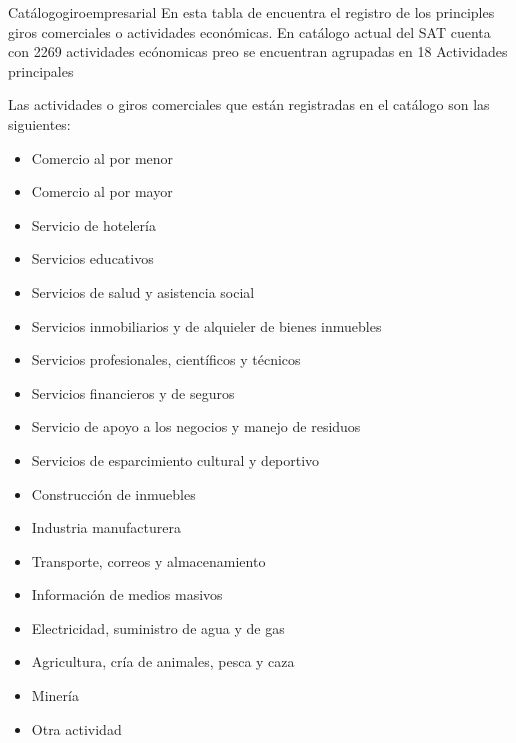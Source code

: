 \begin{BD}{Catálogo}{giroempresarial}{
	En esta tabla de encuentra el registro de los principles giros comerciales o actividades económicas. En catálogo actual del SAT cuenta con 2269 actividades ecónomicas \cite{SAT-AE} preo se encuentran agrupadas en 18 Actividades principales \cite{JCF-AE}
\bigskip
} %
		

		
		
\end{BD}

Las actividades o giros comerciales que están registradas en el catálogo son las siguientes: \\
\begin{itemize}
    \item Comercio al por menor
	\item Comercio al por mayor
	\item Servicio de hotelería
	\item Servicios educativos
	\item Servicios de salud y asistencia social
	\item Servicios inmobiliarios y de alquieler de bienes inmuebles
	\item Servicios profesionales, científicos y técnicos
	\item Servicios financieros y de seguros
	\item Servicio de apoyo a los negocios y manejo de residuos
	\item Servicios de esparcimiento cultural y deportivo
	\item Construcción de inmuebles
	\item Industria manufacturera
	\item Transporte, correos y almacenamiento
	\item Información de medios masivos
	\item Electricidad, suministro de agua y de gas
	\item Agricultura, cría de animales, pesca y caza
	\item Minería
	\item Otra actividad
\end{itemize}
